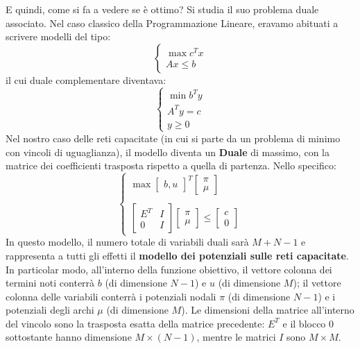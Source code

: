 \documentclass[12pt, a4paper]{article}
\begin{document}
	E quindi, come si fa a vedere se è ottimo? Si studia il suo problema duale associato.
	Nel caso classico della Programmazione Lineare, eravamo abituati a scrivere modelli del tipo:
	\[
	\begin{cases}
		\max c^T x \\
		Ax \le b
	\end{cases}
	\]
	il cui duale complementare diventava:
	\[
	\begin{cases}
		\min b^T y \\
		A^T y = c \\
		y \ge 0
	\end{cases}
	\]
	Nel nostro caso delle reti capacitate (in cui si parte da un problema di minimo con vincoli di uguaglianza), il modello diventa un \textbf{Duale} di massimo, con la matrice dei coefficienti trasposta rispetto a quella di partenza. Nello specifico:
	\[
	\begin{cases}
		\max \begin{bmatrix} b,u \end{bmatrix}^T \begin{bmatrix} \pi \\ \mu \end{bmatrix} \\\\
		\begin{bmatrix}
			E^T & I \\
			0 & I
		\end{bmatrix}
		\begin{bmatrix}
			\pi \\
			\mu
		\end{bmatrix}
		\le
		\begin{bmatrix}
			c \\
			0
		\end{bmatrix}
	\end{cases}
	\]
	In questo modello, il numero totale di variabili duali sarà $M + N - 1$ e rappresenta a tutti gli effetti il \textbf{modello dei potenziali sulle reti capacitate}. 
	In particolar modo, all'interno della funzione obiettivo, il vettore colonna dei termini noti conterrà $b$ (di dimensione $N-1$) e $u$ (di dimensione $M$); il vettore colonna delle variabili conterrà i potenziali nodali $\pi$ (di dimensione $N-1$) e i potenziali degli archi $\mu$ (di dimensione $M$). Le dimensioni della matrice all'interno del vincolo sono la trasposta esatta della matrice precedente: $E^T$ e il blocco $0$ sottostante hanno dimensione $M \times (N-1)$, mentre le matrici $I$ sono $M \times M$.
	
\end{document}
